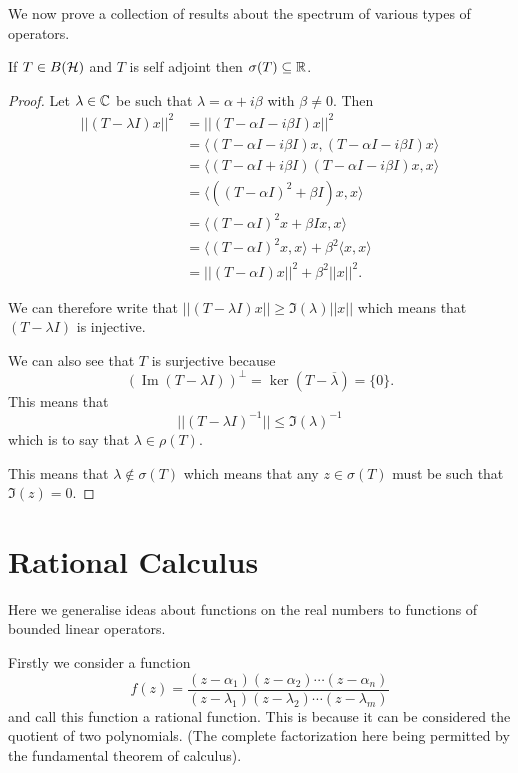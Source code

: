 \documentclass{unswmaths}
\begin{document}
We now prove a collection of results about the spectrum of various types of operators.

\begin{theorem}
	If $ T \in B(\mathcal{H}) $ and $ T $ is self adjoint then $ \sigma(T) \subseteq \mathbb{R} $.
\end{theorem}
\begin{proof}
	Let $ \lambda \in \mathbb{C} $ be such that $ \lambda = \alpha + i \beta $ with $ \beta \neq 0 $.
	Then 
	\begin{align*}
		||(T - \lambda I)x||^2 &= ||( T - \alpha I - i \beta I)x||^2 \\
			&= \langle (T - \alpha I - i \beta I)x, (T - \alpha I - i \beta I)x \rangle \\
			&= \langle (T - \alpha I + i \beta I) (T - \alpha I - i \beta I)x,x \rangle \\
			&= \langle \left((T - \alpha I)^2 + \beta I \right)x,x \rangle \\
			&= \langle (T - \alpha I)^2x + \beta Ix ,x \rangle \\
			&= \langle (T - \alpha I)^2 x, x \rangle + \beta^2 \langle x, x\rangle \\
			&= ||(T-\alpha I)x||^2 + \beta^2 ||x||^2.
	\end{align*}
	
	We can therefore write that $ || (T- \lambda I)x || \geq \Im(\lambda)||x|| $ which means that
	$ (T - \lambda I ) $ is injective.
	
	We can also see that $ T $ is surjective because
	$$
		\left(\operatorname{Im}(T - \lambda I)\right)^\perp = \ker(T - \overline{\lambda}) = \{ 0 \}.
	$$
	This means that $$ || (T - \lambda I)^{-1} || \leq \Im(\lambda)^{-1} $$ which is to say that 
	$ \lambda \in \rho(T) $.
	
	This means that $ \lambda \not\in \sigma(T) $ which means that any $ z \in \sigma(T) $ must be such that
	$ \Im(z) = 0 $.
\end{proof}

\section*{Rational Calculus}
Here we generalise ideas about functions on the real numbers to functions of bounded linear operators.

Firstly we consider a function 
$$
	f(z) = \frac{(z-\alpha_1) (z - \alpha_2) \cdots (z - \alpha_n)}{(z - \lambda_1) (z- \lambda_2) \cdots (z - \lambda_m)}
$$
and call this function a rational function. This is because it can be considered the quotient of two polynomials. (The complete factorization here being
permitted by the fundamental theorem of calculus).
\end{document}
